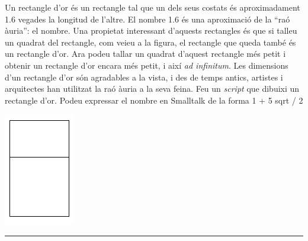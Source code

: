\begin{center}
\colorbox{black}{}
\end{center}
{\small
\noindent
Un rectangle d'or és un rectangle tal que un dels seus costats és aproximadament 1.6 vegades la longitud de l'altre. El nombre 1.6 és una aproximació de la ``raó àuria'': el nombre. Una propietat interessant d'aquests rectangles és que si talleu un quadrat del rectangle, com veieu a la figura, el rectangle que queda també és un rectangle d'or. Ara podeu tallar un quadrat d'aquest rectangle més petit i obtenir un rectangle d'or encara més petit, i així \emph{ad infinitum}. Les dimensions d'un rectangle d'or són agradables a la vista, i des de temps antics, artistes i arquitectes han utilitzat la raó àuria a la seva feina. Feu un \emph{script} que dibuixi un rectangle d'or. Podeu expressar el nombre en Smalltalk de la forma \textsf{1 + 5 sqrt / 2}}
\begin{center}
\includegraphics[scale=2.5]{Imatges/figuraE8-4.png}
\end{center}
\noindent
\rule{\textwidth}{3pt}

